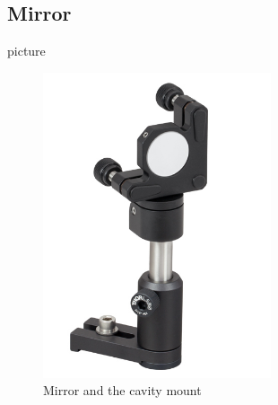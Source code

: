 \subsection{Mirror}
picture
\begin{figure}[h!]
\label{fig:mirror}
 \includegraphics[width=0.6\textwidth]{Figures/mirror.jpg}
 \caption{Mirror and the cavity mount} 
\end{figure}

